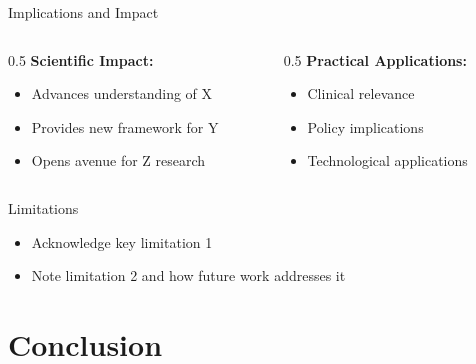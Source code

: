 \documentclass[aspectratio=169,11pt]{beamer}
\begin{document}
\begin{frame}{Implications and Impact}
  \begin{columns}[T]
    
    \begin{column}{0.5\textwidth}
      \textbf{Scientific Impact:}
      \begin{itemize}
        \item Advances understanding of X
        \item Provides new framework for Y
        \item Opens avenue for Z research
      \end{itemize}
    \end{column}
    
    \begin{column}{0.5\textwidth}
      \textbf{Practical Applications:}
      \begin{itemize}
        \item Clinical relevance
        \item Policy implications
        \item Technological applications
      \end{itemize}
    \end{column}
    
  \end{columns}
  
  \vspace{0.5cm}
  
  \begin{block}{Limitations}
    \begin{itemize}
      \item Acknowledge key limitation 1
      \item Note limitation 2 and how future work addresses it
    \end{itemize}
  \end{block}
\end{frame}


\section{Conclusion}
\end{document}
